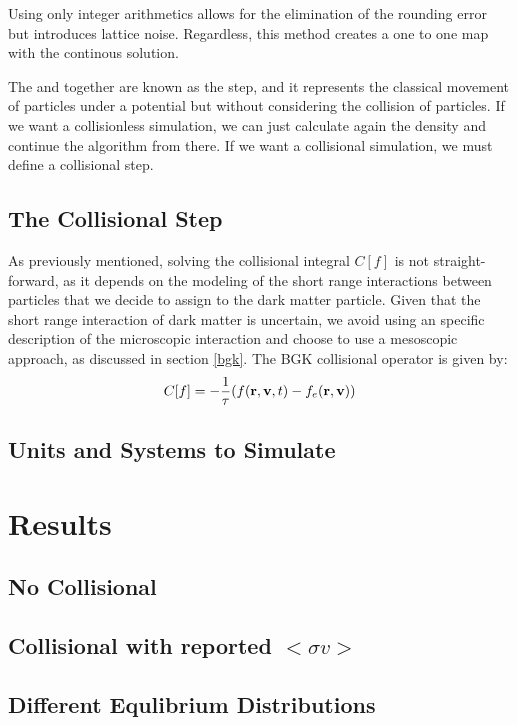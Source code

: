 Using only integer arithmetics allows for the elimination of the rounding error but introduces lattice noise. Regardless, this method creates a one to one map with the continous solution.\cite{franco} \cite{integerLatticeDynamics}

The  and  together are known as the  step, and it represents the classical movement of particles under a potential but without considering the collision of particles. If we want a collisionless simulation, we can just calculate again the density and continue the algorithm from there. If we want a collisional simulation, we must define a collisional step.

\section{The Collisional Step}
As previously mentioned, solving the collisional integral $C[f]$ is not straight-forward, as it depends on the modeling of the short range interactions between particles that we decide to assign to the dark matter particle. Given that the short range interaction of dark matter is uncertain, we avoid using an specific description of the microscopic interaction and choose to use a mesoscopic approach, as discussed in section \ref{bgk}. The BGK collisional operator is given by:\\
\begin{equation}
C[f] = -\frac{1}{\tau}(\f - f_e(\rv))
\end{equation}

\section{Units and Systems to Simulate}




















\chapter{Results}
\section{No Collisional}
\section{Collisional with reported $<\sigma v>$}
\section{Different Equlibrium Distributions}